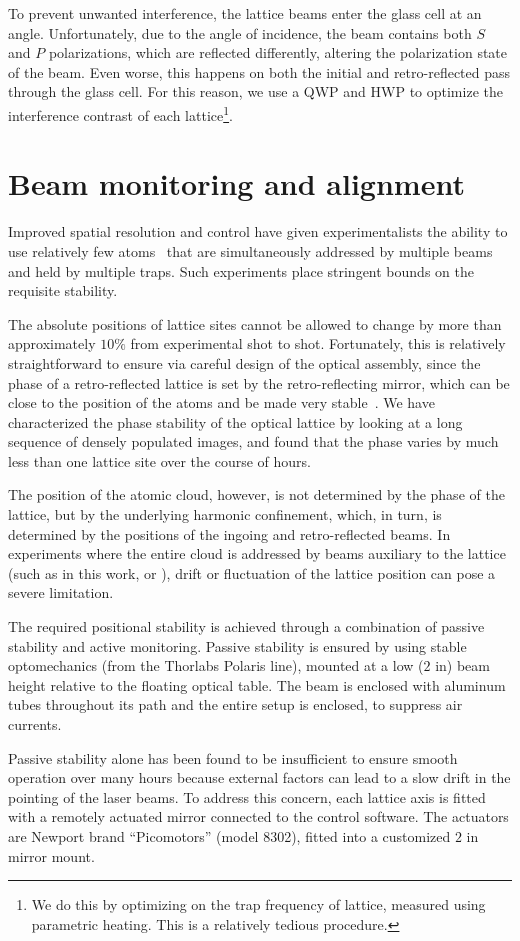\documentclass[twocolumn,aps,pra,showpacs,preprintnumbers,bibnotes]{revtex4-1}
\begin{document}
To prevent unwanted interference, the lattice beams enter the glass cell at an angle. 
Unfortunately, due to the angle of incidence, the beam contains both $S$ and $P$ polarizations, which are reflected differently, altering the polarization state of the beam.
Even worse, this happens on both the initial and retro-reflected pass through the glass cell.
For this reason, we use a QWP and HWP to optimize the interference contrast of each lattice\footnote{We do this by optimizing on the trap frequency of lattice, measured using parametric heating. This is a relatively tedious procedure.}.


\section{Beam monitoring and alignment}

Improved spatial resolution and control have given experimentalists the ability to use relatively few atoms~\cite{Preiss2015, Choi2016, Mazurenko2016} that are simultaneously addressed by multiple beams and held by multiple traps.
Such experiments place stringent bounds on the requisite stability. 

The absolute positions of lattice sites cannot be allowed to change by more than approximately $10\%$ from experimental shot to shot.
Fortunately, this is relatively straightforward to ensure via careful design of the optical assembly, since the phase of a retro-reflected lattice is set by the retro-reflecting mirror, which can be close to the position of the atoms and be made very stable~\cite{Huber2014}. 
We have characterized the phase stability of the optical lattice by looking at a long sequence of densely populated images, and found that the phase varies by much less than one lattice site over the course of hours.

The position of the atomic cloud, however, is not determined by the phase of the lattice, but by the underlying harmonic confinement, which, in turn, is determined by the positions of the ingoing and retro-reflected beams. 
In experiments where the entire cloud is addressed by beams auxiliary to the lattice (such as in this work, \cite{Mazurenko2016} or \cite{Choi2016}), drift or fluctuation of the lattice position can pose a severe limitation.

The required positional stability is achieved through a combination of passive stability and active monitoring. 
Passive stability is ensured by using stable optomechanics (from the Thorlabs Polaris line), mounted at a low ($2$ in) beam height relative to the floating optical table.
The beam is enclosed with aluminum tubes throughout its path and the entire setup is enclosed, to suppress air currents.

Passive stability alone has been found to be insufficient to ensure smooth operation over many hours because external factors can lead to a slow drift in the pointing of the laser beams. 
To address this concern, each lattice axis is fitted with a remotely actuated mirror connected to the control software.
The actuators are Newport brand ``Picomotors'' (model 8302), fitted into a customized $2$ in mirror mount.
\end{document}
